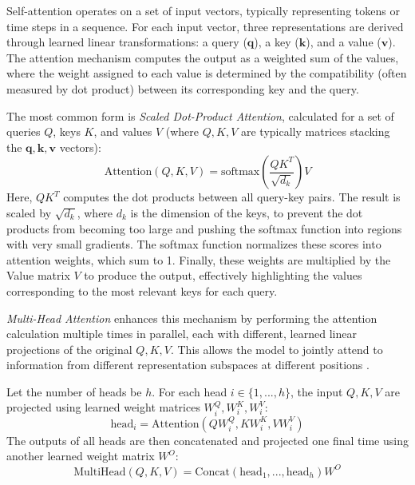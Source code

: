 Self-attention operates on a set of input vectors, typically representing tokens or time steps in a sequence. For each input vector, three representations are derived through learned linear transformations: a query (\( \bm{q} \)), a key (\( \bm{k} \)), and a value (\( \bm{v} \)). The attention mechanism computes the output as a weighted sum of the values, where the weight assigned to each value is determined by the compatibility (often measured by dot product) between its corresponding key and the query.

The most common form is \textit{Scaled Dot-Product Attention}, calculated for a set of queries \( Q \), keys \( K \), and values \( V \) (where \( Q, K, V \) are typically matrices stacking the \( \bm{q}, \bm{k}, \bm{v} \) vectors):
\begin{equation}
  \text{Attention}(Q, K, V) = \text{softmax}\left(\frac{QK^T}{\sqrt{d_k}}\right) V
  \label{eq:scaled_dot_product_attention}
\end{equation}
Here, \( QK^T \) computes the dot products between all query-key pairs. The result is scaled by \( \sqrt{d_k} \), where \( d_k \) is the dimension of the keys, to prevent the dot products from becoming too large and pushing the softmax function into regions with very small gradients. The softmax function normalizes these scores into attention weights, which sum to 1. Finally, these weights are multiplied by the Value matrix \( V \) to produce the output, effectively highlighting the values corresponding to the most relevant keys for each query.

\textit{Multi-Head Attention} enhances this mechanism by performing the attention calculation multiple times in parallel, each with different, learned linear projections of the original \( Q, K, V \). This allows the model to jointly attend to information from different representation subspaces at different positions \autocite{vaswani2017attention}.

Let the number of heads be \( h \). For each head \( i \in \{1, ..., h\} \), the input \( Q, K, V \) are projected using learned weight matrices \( W^Q_i, W^K_i, W^V_i \):
\begin{equation}
  \text{head}_i = \text{Attention}(Q W^Q_i, K W^K_i, V W^V_i)
  \label{eq:attention_head_i}
\end{equation}
The outputs of all heads are then concatenated and projected one final time using another learned weight matrix \( W^O \):
\begin{equation}
  \text{MultiHead}(Q, K, V) = \text{Concat}(\text{head}_1, ..., \text{head}_h) W^O
  \label{eq:multihead_attention}
\end{equation}


